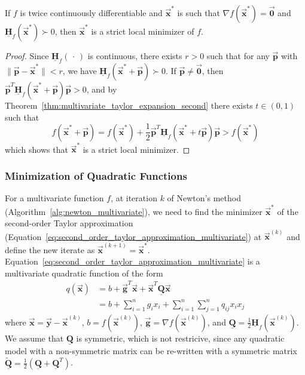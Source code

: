 \documentclass[9pt, headings=standardclasses, parskip=half]{scrartcl}
\newcommand{\matr}[1]{\underline{\boldsymbol{#1}}}
\newcommand{\vect}[1]{\vec{\boldsymbol{#1}}}
\begin{document}
\begin{theorem}\label{thm:sufficient_optimality_conditions_multivariate}
If \(f\) is twice continuously differentiable and \(\vect{x}^{*}\) is such that \(\nabla f(\vect{x}^{*})=\vect{0}\) and \(\matr{H}_{f}(\vect{x}^{*})\succ 0\), then \(\vect{x}^{*}\) is a strict local minimizer of \(f\).
\end{theorem}
\begin{proof}
Since \(\matr{H}_{f}(\, \cdot \,)\) is continuous, there exists \(r>0\) such that for any \(\vect{p}\) with \(\|\vect{p} - \vect{x}^{*}\| < r\), we have \(\matr{H}_{f}(\vect{x}^{*}+\vect{p}) \succ 0\). 
If \(\vect{p} \neq \vect{0}\), then \(\vect{p}^{T}\matr{H}_{f}(\vect{x}^{*}+\vect{p})\vect{p} > 0\), and by Theorem~\ref{thm:multivariate_taylor_expansion_second} there exists \(t \in (0,1)\) such that
\[
f(\vect{x}^{*}+\vect{p})=f(\vect{x}^{*})+\frac{1}{2}\vect{p}^{T}\matr{H}_{f}(\vect{x}^{*}+t\vect{p})\vect{p} > f(\vect{x}^{*}) %
\]
which shows that \(\vect{x}^{*}\) is a strict local minimizer.
\end{proof}

\subsubsection{Minimization of Quadratic Functions}
\label{subsubsec:quadratic_minimization}
For a multivariate function \(f\), at iteration \(k\) of Newton's method (Algorithm~\ref{alg:newton_multivariate}), we need to find the minimizer \(\vect{x}^{*}\) of the second-order Taylor approximation (Equation~\ref{eq:second_order_taylor_approximation_multivariate}) at \(\vect{x}^{(k)}\) and define the new iterate as \(\vect{x}^{(k+1)} = \vect{x}^{*}\).
Equation~\ref{eq:second_order_taylor_approximation_multivariate} is a multivariate quadratic function of the form
\begin{align}
q(\vect{x}) &= b + \vect{g}^{T}\vect{x} + \vect{x}^{T}\matr{Q}\vect{x} \label{eq:multivariate_quadratic_function} \\
&= b + \sum_{i=1}^{n}g_{i}x_{i} + \sum_{i=1}^{n}\sum_{j=1}^{n}q_{ij}x_{i}x_{j} \label{eq:multivariate_quadratic_function_expanded}
\end{align}
where \(\vect{x} = \vect{y} - \vect{x}^{(k)}\), \(b = f(\vect{x}^{(k)})\), \(\vect{g} = \nabla f(\vect{x}^{(k)})\), and \(\matr{Q} = \frac{1}{2}\matr{H}_{f}(\vect{x}^{(k)})\).
We assume that \(\matr{Q}\) is symmetric, which is not restricive, since any quadratic model with a non-symmetric matrix can be re-written with a symmetric matrix \(\tilde{\matr{Q}} = \frac{1}{2}(\matr{Q}+\matr{Q}^{T})\).
\end{document}
